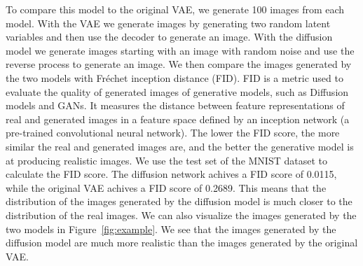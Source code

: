 To compare this model to the original VAE, we generate 100 images from each model. With the VAE we generate images by generating two random latent variables and then use the decoder to generate an image. With the diffusion model we generate images starting with an image with random noise and use the reverse process to generate an image. We then compare the images generated by the two models with Fréchet inception distance (FID). FID is a metric used to evaluate the quality of generated images of generative models, such as Diffusion models and GANs. It measures the distance between feature representations of real and generated images in a feature space defined by an inception network (a pre-trained convolutional neural network). The lower the FID score, the more similar the real and generated images are, and the better the generative model is at producing realistic images. We use the test set of the MNIST dataset to calculate the FID score. The diffusion network achives a FID score of 0.0115, while the original VAE achives a FID score of 0.2689. This means that the distribution of the images generated by the diffusion model is much closer to the distribution of the real images. We can also visualize the images generated by the two models in Figure~\ref{fig:example}. We see that the images generated by the diffusion model are much more realistic than the images generated by the original VAE.
